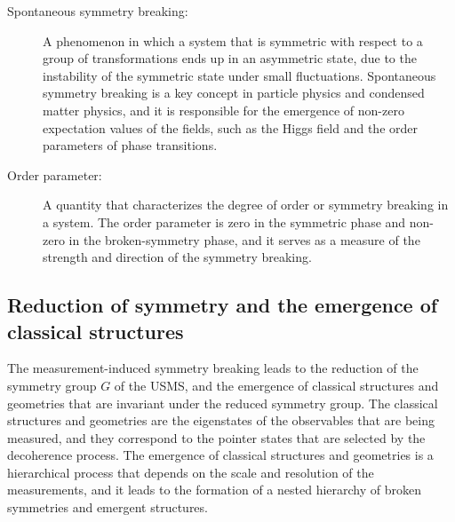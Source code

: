 \begin{tcolorbox}[colback=blue!5!white,colframe=blue!75!black,title=New terms]
    \begin{description}
        \item[Spontaneous symmetry breaking:] A phenomenon in which a system that is symmetric with respect to a group of transformations ends up in an asymmetric state, due to the instability of the symmetric state under small fluctuations. Spontaneous symmetry breaking is a key concept in particle physics and condensed matter physics, and it is responsible for the emergence of non-zero expectation values of the fields, such as the Higgs field and the order parameters of phase transitions.
        \item[Order parameter:] A quantity that characterizes the degree of order or symmetry breaking in a system. The order parameter is zero in the symmetric phase and non-zero in the broken-symmetry phase, and it serves as a measure of the strength and direction of the symmetry breaking.
    \end{description}
\end{tcolorbox}

\subsection{Reduction of symmetry and the emergence of classical structures}
The measurement-induced symmetry breaking leads to the reduction of the symmetry group $G$ of the USMS, and the emergence of classical structures and geometries that are invariant under the reduced symmetry group. The classical structures and geometries are the eigenstates of the observables that are being measured, and they correspond to the pointer states that are selected by the decoherence process. The emergence of classical structures and geometries is a hierarchical process that depends on the scale and resolution of the measurements, and it leads to the formation of a nested hierarchy of broken symmetries and emergent structures.


